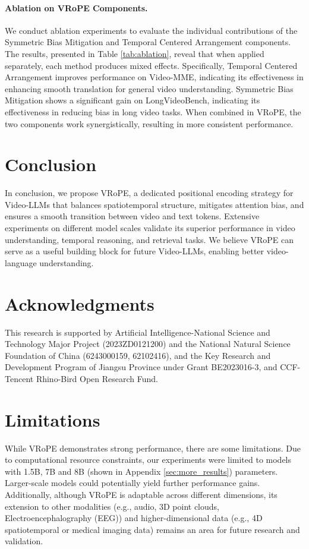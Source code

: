 \documentclass[11pt]{article}
\newcommand{\methodname}{VRoPE\xspace}
\begin{document}
\paragraph{Ablation on \methodname Components.}
We conduct ablation experiments to evaluate the individual contributions of the Symmetric Bias Mitigation and Temporal Centered Arrangement components. The results, presented in Table \ref{tab:ablation}, reveal that when applied separately, each method produces mixed effects. 
Specifically, Temporal Centered Arrangement improves performance on Video-MME, indicating its effectiveness in enhancing smooth translation for general video understanding. Symmetric Bias Mitigation shows a significant gain on LongVideoBench, indicating its effectiveness in reducing bias in long video tasks. 
When combined in \methodname, the two components work synergistically, resulting in more consistent performance. 

\section{Conclusion}
In conclusion, we propose \methodname, a dedicated positional encoding strategy for Video-LLMs that balances spatiotemporal structure, mitigates attention bias, and ensures a smooth transition between video and text tokens. Extensive experiments on different model scales validate its superior performance in video understanding, temporal reasoning, and retrieval tasks. We believe \methodname can serve as a useful building block for future Video-LLMs, enabling better video-language understanding.

\section{Acknowledgments}

This research is supported by Artificial Intelligence-National Science and Technology Major Project (2023ZD0121200) and the National Natural Science Foundation of China (6243000159, 62102416), and the Key Research and Development Program of Jiangsu Province under Grant BE2023016-3, and CCF-Tencent Rhino-Bird Open Research Fund.

\section{Limitations}
While \methodname demonstrates strong performance, there are some limitations. Due to computational resource constraints, our experiments were limited to models with 1.5B, 7B and 8B (shown in Appendix \ref{sec:more_results}) parameters. Larger-scale models could potentially yield further performance gains. Additionally, although \methodname is adaptable across different dimensions, its extension to other modalities (e.g., audio, 3D point clouds, Electroencephalography (EEG)) and higher-dimensional data (e.g., 4D spatiotemporal or medical imaging data) remains an area for future research and validation.
\end{document}
